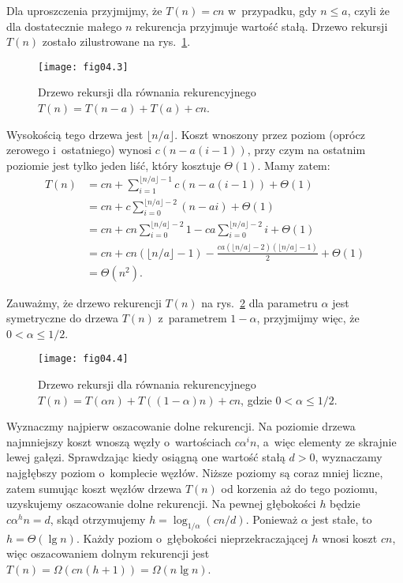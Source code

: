 \exercise %
Dla uproszczenia przyjmijmy, że $T(n)=cn$ w~przypadku, gdy $n\le a$, czyli że dla dostatecznie małego $n$ rekurencja przyjmuje wartość stałą. Drzewo rekursji $T(n)$ zostało zilustrowane na rys.~\ref{fig:4.2-4}.
\begin{figure}[ht]
	\begin{center}
		\texttt{[image: fig04.3]}
	\end{center}
	\caption{Drzewo rekursji dla równania rekurencyjnego $T(n)=T(n-a)+T(a)+cn$.} \label{fig:4.2-4}
\end{figure}
Wysokością tego drzewa jest $\lfloor n/a\rfloor$. Koszt wnoszony przez  poziom (oprócz zerowego i~ostatniego) wynosi $c(n-a(i-1))$, przy czym na ostatnim poziomie jest tylko jeden liść, który kosztuje $\Theta(1)$. Mamy zatem:
\begin{align*}
	T(n) &= cn+\sum_{i=1}^{\lfloor n/a\rfloor-1}c(n-a(i-1))+\Theta(1) \\
	&= cn+c\sum_{i=0}^{\lfloor n/a\rfloor-2}(n-ai)+\Theta(1) \\
	&= cn+cn\sum_{i=0}^{\lfloor n/a\rfloor-2}1-ca\sum_{i=0}^{\lfloor n/a\rfloor-2}i+\Theta(1) \\
	&= cn+cn(\lfloor n/a\rfloor-1)-\frac{ca(\lfloor n/a\rfloor-2)(\lfloor n/a\rfloor-1)}{2}+\Theta(1) \\[2mm]
	&= \Theta(n^2).
\end{align*}

\exercise %
Zauważmy, że drzewo rekurencji $T(n)$ na rys.~\ref{fig:4.2-5} dla parametru $\alpha$ jest symetryczne do drzewa $T(n)$ z~parametrem $1-\alpha$, przyjmijmy więc, że $0<\alpha\le1/2$.
\begin{figure}[ht]
	\begin{center}
		\texttt{[image: fig04.4]}
	\end{center}
	\caption{Drzewo rekursji dla równania rekurencyjnego $T(n)=T(\alpha n)+T((1-\alpha)n)+cn$, gdzie $0<\alpha\le1/2$.} \label{fig:4.2-5}
\end{figure}

Wyznaczmy najpierw oszacowanie dolne rekurencji. Na  poziomie drzewa najmniejszy koszt wnoszą węzły o~wartościach $c\alpha^in$, a~więc elementy ze skrajnie lewej gałęzi. Sprawdzając kiedy osiągną one wartość stałą $d>0$, wyznaczamy najgłębszy poziom o~komplecie węzłów. Niższe poziomy są coraz mniej liczne, zatem sumując koszt węzłów drzewa $T(n)$ od korzenia aż do tego poziomu, uzyskujemy oszacowanie dolne rekurencji. Na pewnej głębokości $h$ będzie $c\alpha^hn=d$, skąd otrzymujemy $h=\log_{1/\alpha}(cn/d)$. Ponieważ $\alpha$ jest stałe, to $h=\Theta(\lg n)$. Każdy poziom o~głębokości nieprzekraczającej $h$ wnosi koszt $cn$, więc oszacowaniem dolnym rekurencji jest $T(n)=\Omega(cn(h+1))=\Omega(n\lg n)$.

